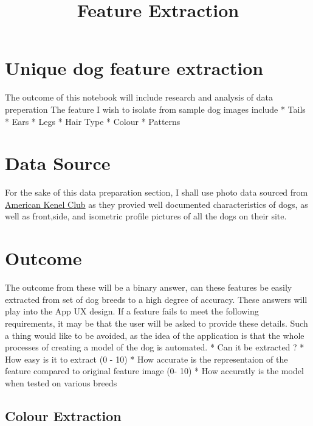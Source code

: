 \documentclass[11pt]{article}
\title{Feature Extraction}
\begin{document}
    
    
    \maketitle
    
    

    
    \hypertarget{unique-dog-feature-extraction}{%
\section{Unique dog feature
extraction}\label{unique-dog-feature-extraction}}

The outcome of this notebook will include research and analysis of data
preperation The feature I wish to isolate from sample dog images include
* Tails * Ears * Legs * Hair Type * Colour * Patterns

\hypertarget{data-source}{%
\section{Data Source}\label{data-source}}

For the sake of this data preparation section, I shall use photo data
sourced from \href{https://www.akc.org/dog-breeds}{American Kenel Club}
as they provied well documented characteristics of dogs, as well as
front,side, and isometric profile pictures of all the dogs on their
site.

\hypertarget{outcome}{%
\section{Outcome}\label{outcome}}

The outcome from these will be a binary answer, can these features be
easily extracted from set of dog breeds to a high degree of accuracy.
These answers will play into the App UX design. If a feature fails to
meet the following requirements, it may be that the user will be asked
to provide these details. Such a thing would like to be avoided, as the
idea of the application is that the whole processes of creating a model
of the dog is automated. * Can it be extracted ? * How easy is it to
extract (0 - 10) * How accurate is the representaion of the feature
compared to original feature image (0- 10) * How accuratly is the model
when tested on various breeds

\hypertarget{colour-extraction}{%
\subsection{Colour Extraction}\label{colour-extraction}}
\end{document}
